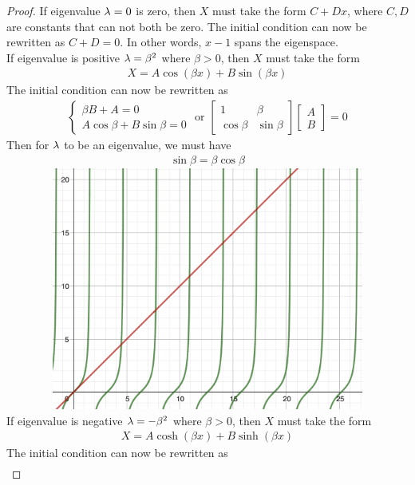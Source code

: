 \documentclass{report}
\begin{document}
\begin{proof}
If eigenvalue  $\lambda =0$ is zero, then $X$ must take the form $C+Dx$, where  $C,D$ are constants that can not both be zero. The initial condition can now be rewritten as $C+D=0$. In other words, $x-1$ spans the eigenspace. \\

If eigenvalue is positive $\lambda =\beta ^2$ where $\beta >0$, then $X$ must take the form 
\begin{align*}
X=A\cos (\beta x)+B \sin (\beta x)
\end{align*}
The initial condition can now be rewritten as 
\begin{align*}
\begin{cases}
  \beta  B + A=0 \\
  A \cos\beta +B \sin \beta =0
\end{cases}\text{ or } \begin{bmatrix}
1 & \beta  \\
\cos \beta  & \sin \beta 
\end{bmatrix}\begin{bmatrix}
A\\
B
\end{bmatrix}=0
\end{align*}
Then for $\lambda $ to be an eigenvalue, we must have 
\begin{align*}
\sin \beta = \beta  \cos \beta  
\end{align*}
\includegraphics[height=8cm,width=18cm]{pdef}
If eigenvalue is negative $\lambda =-\beta ^2$ where $\beta >0$, then $X$ must take the form 
 \begin{align*}
X=A \cosh (\beta x)+B \sinh (\beta x)
\end{align*}
The initial condition can now be rewritten as 
\begin{align*}

\end{align*}
\end{proof}
\end{document}
